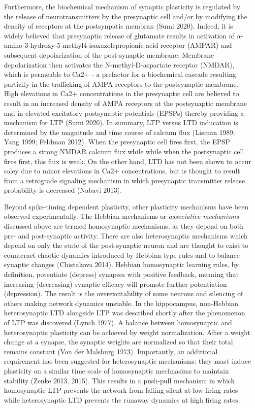 \documentclass{ucetd}
\begin{document}
Furthermore, the biochemical mechanism of synaptic plasticity is regulated by the release of neurotransmitters by the presynaptic cell and/or by modifying the density of receptors at the postsynpatic membran (Sumi 2020). Indeed, it is widely believed that presynaptic release of glutamate results in activation of $\alpha$-amino-3-hydroxy-5-methyl4-isoxazolepropionic acid receptor (AMPAR) and subsequent depolarization of the post-synaptic membrane. Membrane depolarization then activates the N-methyl-D-aspartate receptor (NMDAR), which is permeable to Ca2+ - a prefactor for a biochemical cascade resulting partially in the trafficking of AMPA receptors to the postsynaptic membrane. High elevations in Ca2+ concentrations in the presynaptic cell are believed to result in an increased density of AMPA receptors at the postsynaptic membrane and in elevated excitatory postsynaptic potentials (EPSPs) thereby providing a mechanism for LTP (Sumi 2020). In summary, LTP versus LTD inducation is determined by the magnitude and time course of calcium flux (Lisman 1989; Yang 1999; Feldman 2012). When the presynaptic cell fires first, the EPSP produces a strong NMDAR calcium flux while while when the postsynaptic cell fires first, this flux is weak. On the other hand, LTD has not been shown to occur soley due to minor elevations in Ca2+ concentrations, but is thought to result from a retrograde signaling mechanism in which presynaptic transmitter release probability is decreased (Nabavi 2013).

Beyond spike-timing dependent plasticity, other plasticity mechanisms have been observed experimentally. The Hebbian mechanisms or \emph{associative mechanisms} discussed above are termed homosynaptic mechanisms, as they depend on both pre- and post-synaptic activity. There are also heterosynaptic mechanisms which depend on only the state of the post-synaptic neuron and are thought to exist to counteract chaotic dynamics introduced by Hebbian-type rules and to balance synaptic changes (Chistakova 2014). Hebbian homosynaptic learning rules, by definition, potentiate (depress) synapses with positive feedback, meaning that increasing (decreasing) synaptic efficacy will promote further potentiation (depression). The result is the overexcitability of some neurons and silencing of others making network dynamics unstable. In the hippocampus, non-Hebbian heterosynaptic LTD alongside LTP was described shortly after the phenomenon of LTP was discovered (Lynch 1977). A balance between homosynaptic and heterosynaptic plasticity can be achieved by weight normalization. After a weight change at a synapse, the synaptic weights are normalized so that their total remains constant (Von der Malsburg 1973). Importantly, an additional requirement has been suggested for heterosynaptic mechanisms: they must induce plasticity on a similar time scale of homosynaptic mechnasims to maintain stability (Zenke 2013, 2015). This results in a push-pull mechanism in which homosynaptic LTP prevents the network from falling silent at low firing rates while heterosynaptic LTD prevents the runaway dynamics at high firing rates.
\end{document}
